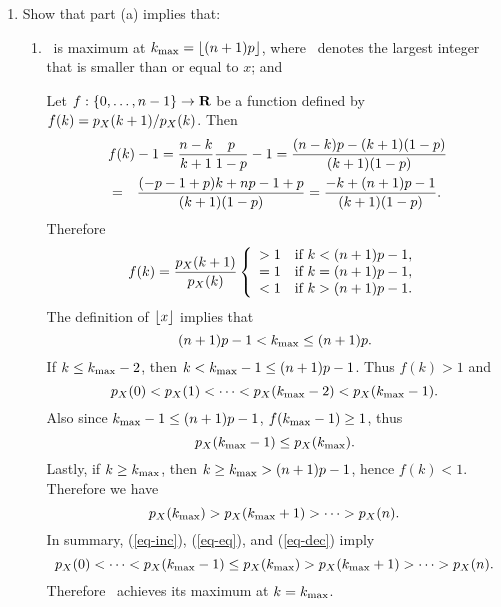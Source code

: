 \begin{enumerate}
\begin{enumerate}
		\item Show that part (a) implies that:
		\begin{enumerate}
			\item {}\ is maximum at $k_\mathrm{max} = \lfloor (n + 1)p \rfloor$,
			where \ denotes the largest integer that is smaller than or equal to $x$;
			and
			\ifdefined\sol
			\begin{solution}
			Let $f:\{0,\ldots,n-1\} \to {\mbox{\bf R}}$ be a function defined by
			$f(k) = {p_{X}(k+1)}/{p_{X}(k)}$.
			Then
			\begin{eqnarray*}
				\lefteqn{
				f(k) - 1
				= \frac{n-k}{k+1} \frac{p}{1-p} - 1
				= \frac{(n-k) p - (k+1) (1-p)}{(k+1)(1-p)}
				}
				\\&=&
				 \frac{(-p-1+p)k + np-1+p}{(k+1)(1-p)}
				= \frac{-k + (n+1)p - 1}{(k+1)(1-p)}.
			\end{eqnarray*}
			Therefore
			\begin{equation}
			\label{eq-var}
				f(k) =
				\frac{p_{X}(k+1)}{p_{X}(k)}
				\left\{ \begin{array}{ll}
				> 1	&\mbox{if } k < (n+1)p - 1,
				\\ = 1	&\mbox{if } k = (n+1)p - 1,
				\\ < 1	&\mbox{if } k > (n+1)p - 1.
				\end{array} \right.
			\end{equation}
			The definition of $\lfloor x \rfloor$ implies that
			\[(n+1)p - 1 < k_\mathrm{max} \leq (n+1)p.\]
			If $k \leq k_\mathrm{max} - 2$,
			then $k < k_\mathrm{max} - 1 \leq (n+1)p - 1$.
			Thus $f(k) > 1$
			and
			\begin{equation}
			\label{eq-inc}
				p_{X}(0) < p_{X}(1) < \cdots < p_{X}(k_\mathrm{max}-2) < p_{X}(k_\mathrm{max}-1).
			\end{equation}
			Also since $k_\mathrm{max} - 1 \leq (n+1)p-1$, $f(k_\mathrm{max}-1) \geq 1$,
			thus
			\begin{equation}
			\label{eq-eq}
				p_{X}(k_\mathrm{max}-1) \leq p_{X}(k_\mathrm{max}).
			\end{equation}
			Lastly, if $k \geq k_\mathrm{max}$,
			then $k \geq k_\mathrm{max} > (n+1)p-1$, hence $ f(k) < 1$.
			Therefore we have
			\begin{equation}
			\label{eq-dec}
				p_{X}(k_\mathrm{max}) > p_{X}(k_\mathrm{max}+1) > \cdots > p_{X}(n).
			\end{equation}
			In summary, (\ref{eq-inc}), (\ref{eq-eq}), and (\ref{eq-dec}) imply
			\begin{equation}
			\label{eq-order}
				p_{X}(0) < \cdots
				< p_{X}(k_\mathrm{max}-1) \leq p_{X}(k_\mathrm{max})
				> p_{X}(k_\mathrm{max}+1) > \cdots > p_{X}(n).
			\end{equation}
			Therefore \ achieves its maximum at $k=k_\mathrm{max}$.
			\end{solution}
			\fi


\end{enumerate}
\end{enumerate}
\end{enumerate}
